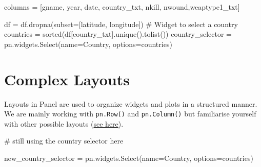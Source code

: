 \documentclass[
  letterpaper,
  DIV=11,
  numbers=noendperiod]{scrreprt}
\newenvironment{Shaded}{\begin{snugshade}}{\end{snugshade}}
\newcommand{\BuiltInTok}[1]{\textcolor[rgb]{0.00,0.23,0.31}{#1}}
\newcommand{\CommentTok}[1]{\textcolor[rgb]{0.37,0.37,0.37}{#1}}
\newcommand{\NormalTok}[1]{\textcolor[rgb]{0.00,0.23,0.31}{#1}}
\newcommand{\OperatorTok}[1]{\textcolor[rgb]{0.37,0.37,0.37}{#1}}
\newcommand{\StringTok}[1]{\textcolor[rgb]{0.13,0.47,0.30}{#1}}
\begin{document}
\begin{Shaded}
\begin{Highlighting}[]
\NormalTok{columns }\OperatorTok{=}\NormalTok{ [}\StringTok{\textquotesingle{}gname\textquotesingle{}}\NormalTok{, }\StringTok{\textquotesingle{}year\textquotesingle{}}\NormalTok{, }\StringTok{\textquotesingle{}date\textquotesingle{}}\NormalTok{, }\StringTok{\textquotesingle{}country\_txt\textquotesingle{}}\NormalTok{, }\StringTok{\textquotesingle{}nkill\textquotesingle{}}\NormalTok{, }\StringTok{\textquotesingle{}nwound\textquotesingle{}}\NormalTok{,}\StringTok{\textquotesingle{}weaptype1\_txt\textquotesingle{}}\NormalTok{]}

\NormalTok{df }\OperatorTok{=}\NormalTok{ df.dropna(subset}\OperatorTok{=}\NormalTok{[}\StringTok{\textquotesingle{}latitude\textquotesingle{}}\NormalTok{, }\StringTok{\textquotesingle{}longitude\textquotesingle{}}\NormalTok{])}
\CommentTok{\# Widget to select a country}
\NormalTok{countries }\OperatorTok{=} \BuiltInTok{sorted}\NormalTok{(df[}\StringTok{\textquotesingle{}country\_txt\textquotesingle{}}\NormalTok{].unique().tolist())}
\NormalTok{country\_selector }\OperatorTok{=}\NormalTok{ pn.widgets.Select(name}\OperatorTok{=}\StringTok{\textquotesingle{}Country\textquotesingle{}}\NormalTok{, options}\OperatorTok{=}\NormalTok{countries)}
\end{Highlighting}
\end{Shaded}

\hypertarget{complex-layouts}{%
\section{Complex Layouts}\label{complex-layouts}}

Layouts in Panel are used to organize widgets and plots in a structured
manner. We are mainly working with \texttt{pn.Row()} and
\texttt{pn.Column()} but familiarise yourself with other possible
layouts
(\href{https://panel.holoviz.org/reference/index.html\#layouts}{see
here}).

\begin{Shaded}
\begin{Highlighting}[]
\CommentTok{\# still using the country selector here}

\NormalTok{new\_country\_selector }\OperatorTok{=}\NormalTok{ pn.widgets.Select(name}\OperatorTok{=}\StringTok{\textquotesingle{}Country\textquotesingle{}}\NormalTok{, options}\OperatorTok{=}\NormalTok{countries)}
\end{Highlighting}
\end{Shaded}
\end{document}
